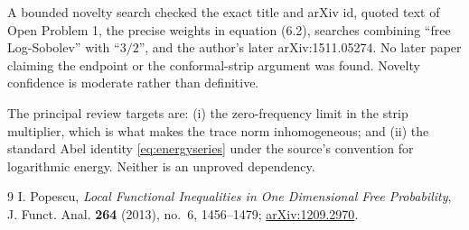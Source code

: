 \documentclass[11pt]{article}
\begin{document}
A bounded novelty search checked the exact title and arXiv id, quoted text of
Open Problem 1, the precise weights in equation (6.2), searches combining
``free Log-Sobolev'' with ``$3/2$'', and the author's later
arXiv:1511.05274. No later paper claiming the endpoint or the conformal-strip
argument was found. Novelty confidence is moderate rather than definitive.

The principal review targets are: (i) the zero-frequency limit in the strip
multiplier, which is what makes the trace norm inhomogeneous; and (ii) the
standard Abel identity \eqref{eq:energyseries} under the source's convention
for logarithmic energy. Neither is an unproved dependency.

\begin{thebibliography}{9}
I. Popescu,
\emph{Local Functional Inequalities in One Dimensional Free Probability},
J. Funct. Anal. \textbf{264} (2013), no.~6, 1456--1479;
\href{https://arxiv.org/abs/1209.2970}{arXiv:1209.2970}.
\end{thebibliography}
\end{document}
